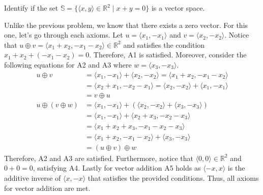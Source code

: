 \documentclass[../main.tex]{subfiles}
\begin{document}
\begin{problem}
Identify if the set $\mathbb{S} = \{ \langle x, y \rangle \in
\mathbb{R}^2 \mid x + y = 0 \}$ is a vector space.
\end{problem}
\begin{solution}
Unlike the previous problem, we know that there exists a zero
vector. For this one, let's go through each axioms. Let $u =
\langle x_1, -x_1 \rangle$ and $v = \langle x_2, -x_2 \rangle$.
Notice that $u \oplus v = \langle x_1 + x_2, -x_1 - x_2 \rangle
\in \mathbb{R}^2$ and satisfies the condition $x_1 + x_2 + (-x_1
-x_2) = 0$. Therefore, A1 is satisfied. Moreover, consider the
following equations for A2 and A3 where $w = \langle x_3, -x_3
\rangle$.
\begin{align*}
    u \oplus v
    &= \langle x_1, -x_1 \rangle + \langle x_2, -x_2 \rangle
    = \langle x_1 + x_2, -x_1 - x_2 \rangle \\
    &= \langle x_2 + x_1, -x_2 - x_1 \rangle
    = \langle x_2, -x_2 \rangle + \langle x_1, -x_1 \rangle \\
    &= v \oplus u \\
    u \oplus (v \oplus w)
    &= \langle x_1, -x_1 \rangle + \left(
        \langle x_2, -x_2 \rangle + \langle x_3, -x_3 \rangle
    \right) \\
    &= \langle x_1, -x_1 \rangle +
        \langle x_2 + x_3, -x_2 - x_3 \rangle \\
    &= \langle x_1 + x_2 + x_3, -x_1 - x_2 - x_3 \rangle \\
    &= \langle x_1 + x_2, -x_1 - x_2 \rangle +
        \langle x_3, -x_3 \rangle \\
    &= (u \oplus v) \oplus w
\end{align*}
Therefore, A2 and A3 are satisfied. Furthermore, notice that
$\langle 0, 0 \rangle \in \mathbb{R}^2$ and $0 + 0 = 0$, satisfying
A4. Lastly for vector addition A5 holds as $\langle -x, x \rangle$
is the additive inverse of $\langle x, -x \rangle$ that satisfies
the provided conditions. Thus, all axioms for vector addition are met.


\end{solution}
\end{document}
